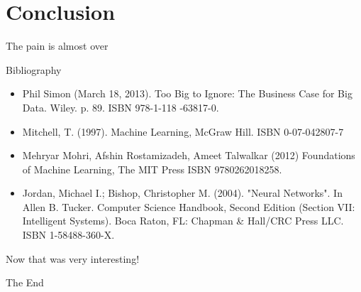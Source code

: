 \documentclass[10pt]{beamer}
\begin{document}
	\section{Conclusion}
		\begin{frame}{The pain is almost over}
		\end{frame}
		\begin{frame}{Bibliography}
			\twocolumn
			\begin{itemize}
				\item \scriptsize{Phil Simon (March 18, 2013). Too Big to Ignore: The Business Case for Big Data. Wiley. p. 89. ISBN 978-1-118
					-63817-0.}
				\item \scriptsize{Mitchell, T. (1997). Machine Learning, McGraw Hill. ISBN 0-07-042807-7}
				\item \scriptsize{ Mehryar Mohri, Afshin Rostamizadeh, Ameet Talwalkar (2012) Foundations of Machine Learning, The MIT Press ISBN 9780262018258.}
				\item \scriptsize{Jordan, Michael I.; Bishop, Christopher M. (2004). "Neural Networks". In Allen B. Tucker. Computer Science Handbook, Second Edition (Section VII: Intelligent Systems). Boca Raton, FL: Chapman \& Hall/CRC Press LLC. ISBN 1-58488-360-X.}
			\end{itemize}
			\onecolumn
		\end{frame}
\endgroup

\begingroup
	\begin{frame}[plain,c]
		\hspace*{6 mm}
		\vspace*{-18 mm}
		\textcolor{blue_light}{\Large{Now that was very interesting!}}
	\end{frame}
	\begin{frame}[plain,c]
		\hspace*{27 mm}
		\vspace*{-20 mm}
		\textcolor{blue_light}{\Large{The End}}
	\end{frame}
\endgroup
\end{document}
